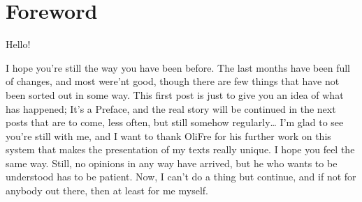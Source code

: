 \frontmatter
\chapter{Foreword}
\label{cha:foreword}
Hello!

I hope you're still the way you have been before. The last months have been full of changes, and most were'nt good, though there are few things that have not been sorted out in some way. This first post is just to give you an idea of what has happened; It's a Preface, and the real story will be continued in the next posts that are to come, less often, but still somehow regularly\ldots
I'm glad to see you're still with me, and I want to thank OliFre for his further work on this system that makes the presentation of my texts really unique. I hope you feel the same way. 
Still, no opinions in any way have arrived, but he who wants to be understood has to be patient. Now, I can't do a thing but continue, and if not for anybody out there, then at least for me myself. 

